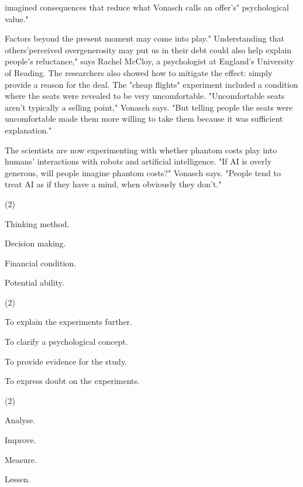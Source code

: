 \documentclass{英语试卷}
\begin{document}
\par imagined consequences that reduce what Vonasch calls an offer's" psychological value."\par
\par Factors beyond the present moment may come into play." Understanding that others'perceived overgenerosity may put us in their debt could also help explain people's reluctance," says Rachel McCloy, a psychologist at England's University of Reading. The researchers also showed how to mitigate the effect: simply provide a reason for the deal. The "cheap flights" experiment included a condition where the seats were revealed to be very uncomfortable. "Uncomfortable seats aren't typically a selling point," Vonasch says. "But telling people the seats were uncomfortable made them more willing to take them because it was sufficient explanation."\par
\par The scientists are now experimenting with whether phantom costs play into humans' interactions with robots and artificial intelligence. "If AI is overly generous, will people imagine phantom costs?" Vonasch says. "People tend to treat AI as if they have a mind, when obviously they don't."\par
{}
\begin{choices}(2)
  \item Thinking method.
  \item Decision making.
  \item Financial condition.
  \item Potential ability.
\end{choices}
\begin{choices}(2)
  \item To explain the experiments further.
  \item To clarify a psychological concept.
  \item To provide evidence for the study.
  \item To express doubt on the experiments.
\end{choices}
\begin{choices}(2)
  \item Analyse.
  \item Improve.
  \item Measure.
  \item Lessen.
\end{choices}
\end{document}
